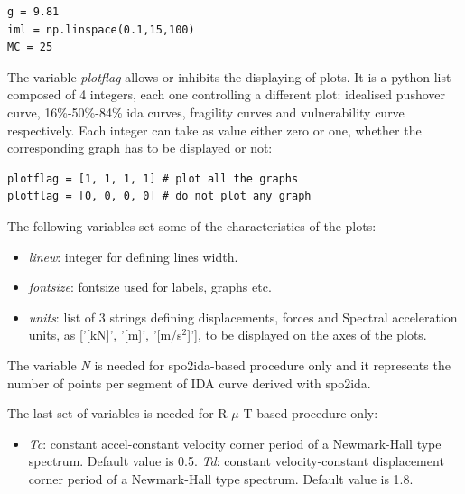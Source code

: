 \begin{Verbatim}[frame=single, commandchars=\\\{\}, samepage=true]
g = 9.81
iml = np.linspace(0.1,15,100)
MC = 25
\end{Verbatim}

The variable \textit{plotflag} allows or inhibits the displaying of plots. It is a python list composed of 4 integers, each one controlling a different plot: idealised pushover curve, 16\%-50\%-84\% ida curves, fragility curves and vulnerability curve respectively. Each integer can take as value either zero or one, whether the corresponding graph has to be displayed or not:

\begin{Verbatim}[frame=single, commandchars=\\\{\}, samepage=true]
plotflag = [1, 1, 1, 1] # plot all the graphs
plotflag = [0, 0, 0, 0] # do not plot any graph
\end{Verbatim}

The following variables set some of the characteristics of the plots:

\begin{itemize}
\item \textit{linew}: integer for defining lines width.
\item \textit{fontsize}: fontsize used for labels, graphs etc.
\item \textit{units}: list of 3 strings defining displacements, forces and Spectral acceleration units, as ['[kN]', '[m]', '[m/s$^2$]'], to be displayed on the axes of the plots.
\end{itemize}

The variable \textit{N} is needed for spo2ida-based procedure only and it represents the number of points per segment of IDA curve derived with spo2ida.

The last set of variables is needed for R-$\mu$-T-based procedure only:
\begin{itemize}
\item \textit{Tc}: constant accel-constant velocity corner period of a Newmark-Hall type spectrum. Default value is 0.5.
\textit{Td}: constant velocity-constant displacement corner period of a Newmark-Hall type spectrum. Default value is 1.8.
\end{itemize}

